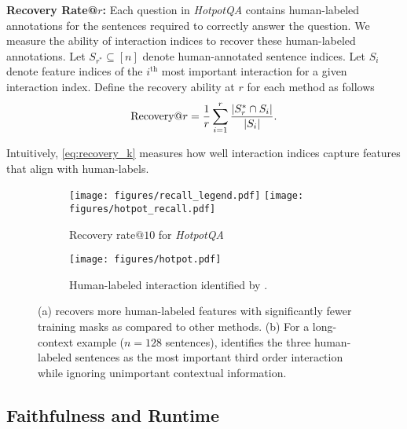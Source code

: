\textbf{Recovery Rate@$r$:} 
%
Each question in \emph{HotpotQA} contains human-labeled annotations for the sentences required to correctly answer the question. 
%
We measure the ability of interaction indices to recover these human-labeled annotations. 
%
Let $S_{r^*} \subseteq [n]$ denote human-annotated sentence indices. %
Let $S_{i}$ denote feature indices of the $i^{\text{th}}$ most important interaction for a given interaction index.
%
Define the recovery ability at $r$ for each method as follows
\vspace{-2pt}
\begin{equation}
\label{eq:recovery_k}
    \text{Recovery@}r = 
    \frac{1}{r}\sum^r_{i=1}\frac{\left\lvert S_r^*\cap S_i \right\rvert}{|S_{i}|}.
\end{equation}
\vspace{-8pt}

Intuitively, \eqref{eq:recovery_k} measures how well interaction indices capture features that align with human-labels.   


\begin{figure*}[t]
\centering
\hfill
\begin{subfigure}[b]{.5\textwidth}
  \centering
    \hspace{0.82cm}\texttt{[image: figures/recall\_legend.pdf]}
  \texttt{[image: figures/hotpot\_recall.pdf]}
  \caption{Recovery rate$@10$ for \emph{HotpotQA} }
  \label{fig:recovery_hotpot}
\end{subfigure}%
\hfill %
\begin{subfigure}[b]{.46\textwidth}
  \centering
    \texttt{[image: figures/hotpot.pdf]}
  \caption{Human-labeled interaction identified by \SpecExp{}.}
  \label{fig:hotpot_additional}
\end{subfigure}
\hfill
\caption{(a) \SpecExp{} recovers more human-labeled features with significantly fewer training masks as compared to other methods. (b) For a long-context example ($n = 128$ sentences), \SpecExp{} identifies the three human-labeled sentences as the most important third order interaction while ignoring unimportant contextual information.}
\vspace{-8pt}
\end{figure*}

\vspace{-8pt}
\subsection{Faithfulness and Runtime}
\vspace{-3pt}


